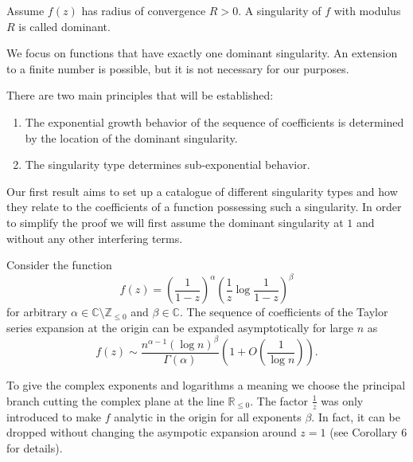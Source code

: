 \begin{defn}
Assume $f(z)$ has radius of convergence $R > 0$. A singularity of $f$ with modulus $R$ is called dominant.
\end{defn}

We focus on functions that have exactly one dominant singularity.
An extension to a finite number is possible, but it is not necessary for our purposes.

There are two main principles that will be established:
\begin{enumerate}
    \item The exponential growth behavior of the sequence of coefficients is determined by the location of the dominant singularity.
    \item The singularity type determines sub-exponential behavior.
\end{enumerate}

Our first result aims to set up a catalogue of different singularity types and how they relate to the coefficients of a function possessing such a singularity.
In order to simplify the proof we will first assume the dominant singularity at $1$ and without any other interfering terms.

\begin{prop}
Consider the function
\begin{equation*}
    f(z) = \left( \frac{1}{1-z} \right)^\alpha \left( \frac{1}{z} \log \frac{1}{1-z} \right) ^{\beta}
\end{equation*}
for arbitrary $\alpha \in \mathbb{C} \setminus \mathbb{Z}_{\leq 0}$ and $\beta \in \mathbb{C}$. 
The sequence of coefficients of the Taylor series expansion at the origin can be expanded asymptotically for large $n$ as
\begin{equation*}
    [z^n] f(z) \sim \frac{n^{\alpha - 1} (\log n)^{\beta}}{\Gamma (\alpha)}  \left( 1 + O \left( \frac{1}{\log n} \right) \right).
\end{equation*}
\end{prop}


To give the complex exponents and logarithms a meaning we choose the principal branch cutting the complex plane at the line $\mathbb{R}_{\leq 0}$. 
The factor $\frac{1}{z}$ was only introduced to make $f$ analytic in the origin for all exponents $\beta$.
In fact, it can be dropped without changing the asympotic expansion around $z = 1$ (see \cite{singularityanalysis} Corollary 6 for details).



